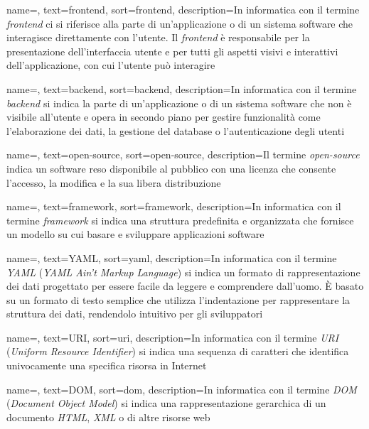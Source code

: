  {
    name=,
    text=frontend,
    sort=frontend,
    description={In informatica con il termine \emph{frontend} ci si riferisce alla parte di un'applicazione o di un sistema software che interagisce direttamente con l'utente. 
    Il \emph{frontend} è responsabile per la presentazione dell'interfaccia utente e per tutti gli aspetti visivi e interattivi dell'applicazione, con cui l'utente può interagire}
}

 {
    name=,
    text=backend,
    sort=backend,
    description={In informatica con il termine \emph{backend} si indica la parte di un'applicazione o di un sistema software che non è visibile all'utente e opera in secondo piano per gestire funzionalità come l'elaborazione dei dati, la gestione del database o l'autenticazione degli utenti}
}

 {
    name=,
    text=open-source,
    sort=open-source,
    description={Il termine \emph{open-source} indica un software reso disponibile al pubblico con una licenza che consente l'accesso, la modifica e la sua libera distribuzione}
}

 {
    name=,
    text=framework,
    sort=framework,
    description={In informatica con il termine \emph{framework} si indica una struttura predefinita e organizzata che fornisce un modello su cui basare e sviluppare applicazioni software}
}

 {
    name=,
    text=YAML,
    sort=yaml,
    description={In informatica con il termine \emph{YAML} (\emph{YAML Ain't Markup Language}) si indica un formato di rappresentazione dei dati progettato per essere facile da leggere e comprendere dall'uomo. È basato su un formato di testo semplice che utilizza l'indentazione per rappresentare la struttura dei dati, rendendolo intuitivo per gli sviluppatori}
}

 {
    name=,
    text=URI,
    sort=uri,
    description={In informatica con il termine \emph{URI} (\emph{Uniform Resource Identifier}) si indica una sequenza di caratteri che identifica univocamente una specifica risorsa in Internet}
}

 {
    name=,
    text=DOM,
    sort=dom,
    description={In informatica con il termine \emph{DOM} (\emph{Document Object Model}) si indica una rappresentazione gerarchica di un documento \emph{HTML}, \emph{XML} o di altre risorse web}
}

